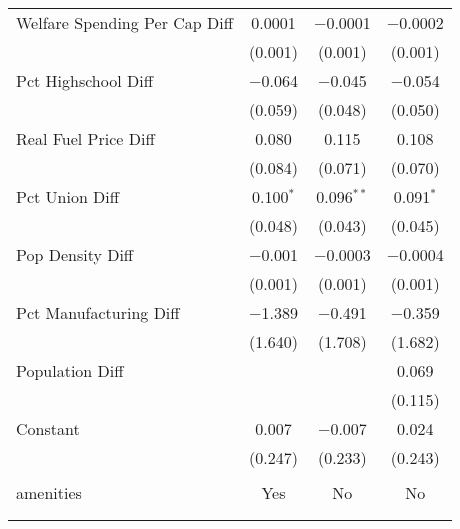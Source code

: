 \begin{table}[!htbp]
\begin{tabular}{@{\extracolsep{5pt}}lccc}
  Welfare Spending Per Cap Diff & 0.0001 & $-$0.0001 & $-$0.0002 \\ 
  & (0.001) & (0.001) & (0.001) \\ 
  Pct Highschool Diff & $-$0.064 & $-$0.045 & $-$0.054 \\ 
  & (0.059) & (0.048) & (0.050) \\ 
  Real Fuel Price Diff & 0.080 & 0.115 & 0.108 \\ 
  & (0.084) & (0.071) & (0.070) \\ 
  Pct Union Diff & 0.100$^{*}$ & 0.096$^{**}$ & 0.091$^{*}$ \\ 
  & (0.048) & (0.043) & (0.045) \\ 
  Pop Density Diff & $-$0.001 & $-$0.0003 & $-$0.0004 \\ 
  & (0.001) & (0.001) & (0.001) \\ 
  Pct Manufacturing Diff & $-$1.389 & $-$0.491 & $-$0.359 \\ 
  & (1.640) & (1.708) & (1.682) \\ 
  Population Diff &  &  & 0.069 \\ 
  &  &  & (0.115) \\ 
  Constant & 0.007 & $-$0.007 & 0.024 \\ 
  & (0.247) & (0.233) & (0.243) \\ 
 \hline \\[-1.8ex] 
amenities & Yes & No & No \\ 
\hline \\[-1.8ex] 
\hline 
\hline \\[-1.8ex] 
\end{tabular} 
\end{table} 
